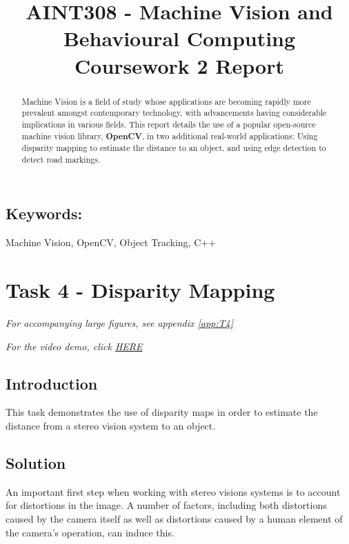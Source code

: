 \documentclass[conference]{IEEEtran}
\begin{document}
%
\title{AINT308 - Machine Vision and Behavioural Computing\\Coursework 2 Report}


\author{
}



\maketitle


\begin{abstract}
 Machine Vision is a field of study whose applications are becoming rapidly more prevalent amongst contemporary technology, with advancements having considerable implications in various fields. This report details the use of a popular open-source machine vision library, \textbf{OpenCV}, in two additional real-world applications: Using disparity mapping to estimate the distance to an object, and using edge detection to detect road markings.
\end{abstract}
\subsection*{Keywords:}
Machine Vision, OpenCV, Object Tracking, C++

\section{Task 4 - Disparity Mapping}
\textit{For accompanying large figures, see appendix \ref{app:T4}}

\textit{For the video demo, click \href{https://youtu.be/kQwU62_2fdQ}{HERE}}
\subsection{Introduction}
This task demonstrates the use of disparity maps in order to estimate the distance from a stereo vision system to an object.
\subsection{Solution}
An important first step when working with stereo visions systems is to account for distortions in the image. A number of factors, including both distortions caused by the camera itself as well as distortions caused by a human element of the camera's operation, can induce this\cite{Distortions}.
\end{document}
